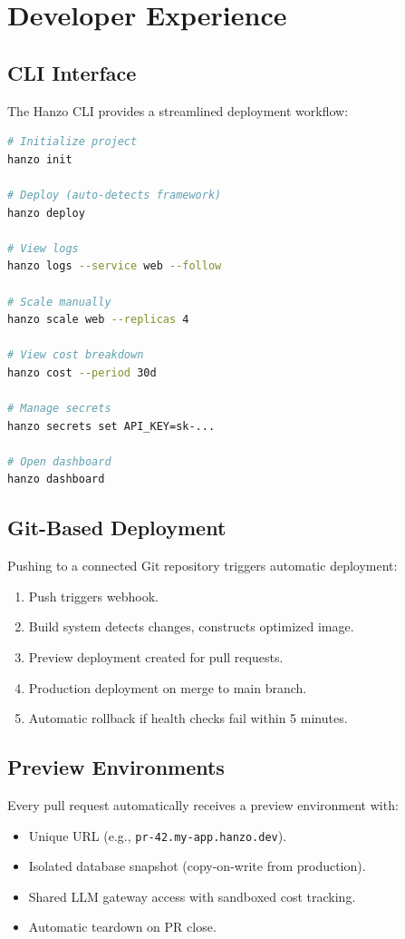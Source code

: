 \documentclass[11pt,twocolumn]{article}
\begin{document}
\section{Developer Experience}
\label{sec:dx}

\subsection{CLI Interface}

The Hanzo CLI provides a streamlined deployment workflow:

\begin{lstlisting}[language=bash,caption={Hanzo CLI deployment workflow.}]
# Initialize project
hanzo init

# Deploy (auto-detects framework)
hanzo deploy

# View logs
hanzo logs --service web --follow

# Scale manually
hanzo scale web --replicas 4

# View cost breakdown
hanzo cost --period 30d

# Manage secrets
hanzo secrets set API_KEY=sk-...

# Open dashboard
hanzo dashboard
\end{lstlisting}

\subsection{Git-Based Deployment}

Pushing to a connected Git repository triggers automatic deployment:

\begin{enumerate}[leftmargin=1.4em]
    \item Push triggers webhook.
    \item Build system detects changes, constructs optimized image.
    \item Preview deployment created for pull requests.
    \item Production deployment on merge to main branch.
    \item Automatic rollback if health checks fail within 5 minutes.
\end{enumerate}

\subsection{Preview Environments}

Every pull request automatically receives a preview environment with:
\begin{itemize}[leftmargin=1.1em]
    \item Unique URL (e.g., \texttt{pr-42.my-app.hanzo.dev}).
    \item Isolated database snapshot (copy-on-write from production).
    \item Shared LLM gateway access with sandboxed cost tracking.
    \item Automatic teardown on PR close.
\end{itemize}
\end{document}
